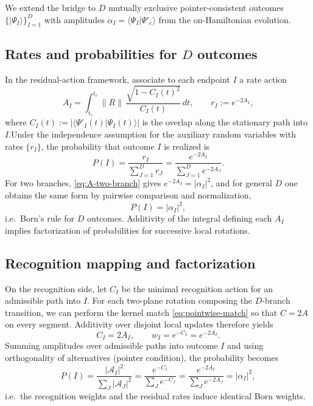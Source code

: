 \documentclass[11pt,letterpaper]{article}
\theoremstyle{definition}
\begin{document}
We extend the bridge to \(D\) mutually exclusive pointer-consistent outcomes \(\{|{\Psi_I}\rangle\}_{I=1}^D\) with amplitudes \(\alpha_I=\langle\Psi_I|\Psi'_e\rangle\) from the on-Hamiltonian evolution.

\subsection{Rates and probabilities for \(D\) outcomes}

In the residual-action framework, associate to each endpoint \(I\) a rate action
\begin{equation}
A_I=\int_{t_s}^{t_e}\!\|R\|\,\frac{\sqrt{1-C_I(t)^2}}{C_I(t)}\,dt,
\qquad
r_I:=e^{-2A_I},
\label{eq:AI-multi}
\end{equation}
where \(C_I(t):=|\langle\Psi'_I(t)|\Psi_I(t)\rangle|\) is the overlap along the stationary path into \(I\).\;Under the independence assumption for the auxiliary random variables with rates \(\{r_I\}\), the probability that outcome \(I\) is realized is
\begin{equation}
P(I)=\frac{r_I}{\sum_{J=1}^D r_J}
=\frac{e^{-2A_I}}{\sum_{J=1}^D e^{-2A_J}}.
\label{eq:P-rates}
\end{equation}
For two branches, \eqref{eq:A-two-branch} gives \(e^{-2A_I}=|\alpha_I|^2\), and for general \(D\) one obtains the same form by pairwise comparison and normalization,
\begin{equation}
P(I)=|\alpha_I|^2,
\end{equation}
i.e.\ Born's rule for \(D\) outcomes. Additivity of the integral defining each \(A_I\) implies factorization of probabilities for successive local rotations.
\subsection{Recognition mapping and factorization}

On the recognition side, let \(C_I\) be the minimal recognition action for an admissible path into \(I\). For each two-plane rotation composing the \(D\)-branch transition, we can perform the kernel match \eqref{eq:pointwise-match} so that \(C=2A\) on every segment. Additivity over disjoint local updates therefore yields
\begin{equation}
C_I=2A_I,
\qquad
w_I=e^{-C_I}=e^{-2A_I}.
\label{eq:CI-equals-2AI}
\end{equation}
Summing amplitudes over admissible paths into outcome \(I\) and using orthogonality of alternatives (pointer condition), the probability becomes
\begin{equation}
P(I)=\frac{|\mathcal A_I|^2}{\sum_J |\mathcal A_J|^2}
=\frac{e^{-C_I}}{\sum_J e^{-C_J}}
=\frac{e^{-2A_I}}{\sum_J e^{-2A_J}}
=|\alpha_I|^2,
\end{equation}
i.e.\ the recognition weights and the residual rates induce identical Born weights.
\end{document}
